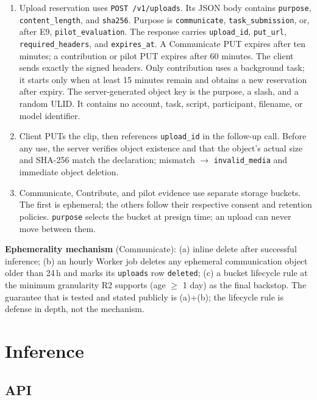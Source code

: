 \documentclass[11pt]{article}
\newcommand{\code}[1]{\texttt{#1}}
\begin{document}
\begin{enumerate}[nosep]
  \item {\small\sloppy Upload reservation uses \code{POST /v1/uploads}. Its JSON body contains
        \code{purpose}, \code{content\_length}, and \code{sha256}. Purpose is
        \code{communicate}, \code{task\_submission}, or, after E9,
        \code{pilot\_evaluation}. The response carries \code{upload\_id},
        \code{put\_url}, \code{required\_headers}, and \code{expires\_at}.
        A Communicate PUT expires after ten minutes; a
        contribution or pilot PUT expires after 60 minutes. The client sends exactly
        the signed headers. Only contribution uses a background task; it starts only
        when at least 15 minutes remain and obtains a new reservation after expiry.
        The server-generated object key is the purpose, a slash, and a random ULID. It
        contains no account, task, script, participant, filename, or model identifier.\par}
  \item Client PUTs the clip, then references \code{upload\_id} in the follow-up
        call. Before any use, the server verifies object existence and that the
        object's actual size and SHA-256 match the declaration; mismatch $\to$
        \code{invalid\_media} and immediate object deletion.
  \item Communicate, Contribute, and pilot evidence use separate storage buckets.
        The first is ephemeral; the others follow their respective consent and
        retention policies. \code{purpose} selects the bucket at presign time; an
        upload can never move between them.
\end{enumerate}

\textbf{Ephemerality mechanism} (Communicate): (a) inline delete after successful
inference; (b) an hourly Worker job deletes any ephemeral communication object
older than 24\,h and marks its \code{uploads} row \code{deleted}; (c) a bucket
lifecycle rule at the minimum granularity R2 supports (age $\geq$ 1 day) as the
final backstop. The guarantee that is tested and stated publicly is (a)+(b); the
lifecycle rule is defense in depth, not the mechanism.

\section{Inference}
\label{sec:infer}

\subsection{API}
\end{document}
